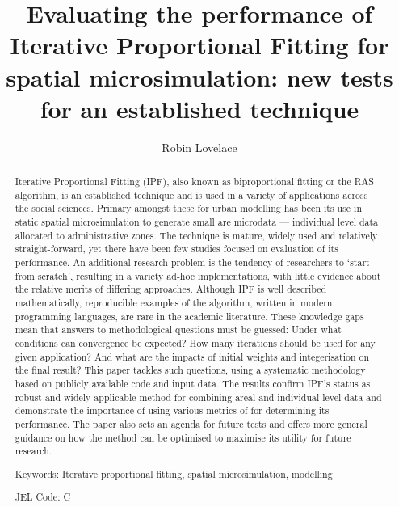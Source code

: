 \documentclass[a4paper,10pt]{article}
\title{Evaluating the performance of Iterative Proportional Fitting for spatial microsimulation: new tests for an established technique}
\author{Robin Lovelace}
\begin{document}
\maketitle

\begin{abstract}
Iterative Proportional Fitting (IPF), also known as biproportional fitting or the RAS algorithm,
is an established technique and
is used in a variety of applications across the social sciences. Primary amongst these
for urban modelling has been its use in
static spatial microsimulation to generate small are microdata --- individual
level data allocated to administrative zones.
The technique is mature, widely used and relatively straight-forward,
yet there have been few studies focused on evaluation of its performance.
An additional research problem is the tendency of 
researchers to `start from scratch', resulting in a variety ad-hoc implementations,
with little evidence about the relative merits of differing approaches.
Although IPF is well described mathematically, reproducible
examples of the algorithm, written in modern programming languages, are rare in the academic literature.
These knowledge gaps mean that answers to methodological questions must be guessed:
Under what conditions can convergence be expected?
How many iterations should be used for any given application? 
And what are the impacts of initial weights and integerisation on the final result?
This paper tackles such questions, using a systematic methodology 
based on publicly available code and input data. 
The results confirm IPF's status as robust and widely applicable 
method for combining areal and individual-level data and demonstrate the importance
of using various metrics of for determining its performance.
The paper also sets an agenda for future tests and offers more general guidance on how
the method can be optimised to maximise its utility for future research.

Keywords: Iterative proportional fitting, spatial microsimulation, modelling

JEL Code: C
\end{abstract}
\end{document}

